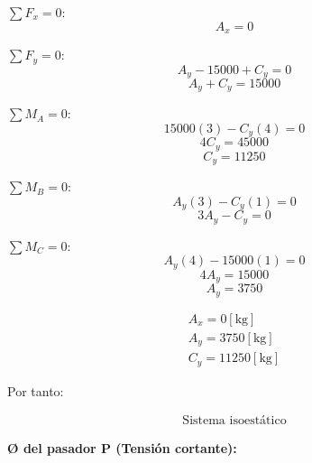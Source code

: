 \documentclass[letter,10pt,twoside]{article}
\begin{document}
$\sum{F_x} = 0$:
\begin{equation*}
    A_x = 0
\end{equation*}

$\sum{F_y} = 0$:
\begin{equation*}
    A_y - 15000 + C_y = 0
\end{equation*}
\begin{equation*}
    A_y + C_y = 15000
\end{equation*}

$\sum{M_A} = 0$:
\begin{equation*}
    15000(3) - C_y(4) = 0
\end{equation*}
\begin{equation*}
    4 C_y = 45000
\end{equation*}
\begin{equation*}
    C_y = 11250
\end{equation*}

$\sum{M_B} = 0$:
\begin{equation*}
    A_y(3) - C_y(1) = 0
\end{equation*}
\begin{equation*}
    3 A_y - C_y = 0
\end{equation*}

$\sum{M_C} = 0$:
\begin{equation*}
    A_y(4) - 15000(1) = 0
\end{equation*}
\begin{equation*}
    4 A_y = 15000
\end{equation*}
\begin{equation*}
    A_y = 3750
\end{equation*}

\begin{equation*}
\boxed{
    \begin{array}{l}
        A_x = 0[\text{kg}] \\
        A_y = 3750[\text{kg}] \\
        C_y = 11250[\text{kg}]
    \end{array}
}
\end{equation*}

Por tanto:

\begin{equation*}
\boxed{
    \begin{array}{l}
        \text{Sistema isoestático}
    \end{array}
}
\end{equation*}

\textbf{{\O} del pasador P (Tensión cortante):}
\end{document}
